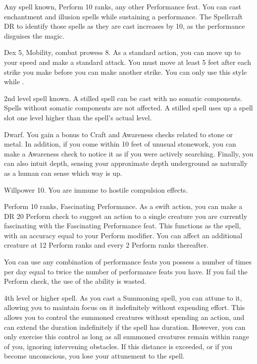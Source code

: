 \featpres Any spell known, Perform 10 ranks, any other Performance feat.
\featben You can cast enchantment and illusion spells while sustaining a performance.
The Spellcraft DR to identify those spells as they are cast increases by 10, as the performance disguises the magic.

\featpres Dex 5, Mobility, combat prowess 8.
\featben As a standard action, you can move up to your speed and make a standard attack.
You must move at least 5 feet after each strike you make before you can make another strike.
You can only use this style while \unencumbered.

\featpre 2nd level spell known.
\featben A stilled spell can be cast with no somatic components.
Spells without somatic components are not affected.
A stilled spell uses up a spell slot one level higher than the spell's actual level.

\featpre Dwarf.
\featben You gain a  bonus to Craft and Awareness checks related to stone or metal.
In addition, if you come within 10 feet of unusual stonework, you can make a Awareness check to notice it as if you were actively searching.
Finally, you can also intuit depth, sensing your approximate depth underground as naturally as a human can sense which way is up.

\featpre Willpower 10.
\featben You are immune to hostile compulsion effects.

\featpres Perform 10 ranks, Fascinating Performance.
\featben As a swift action, you can make a DR 20 Perform check to suggest an action to a single creature you are currently fascinating with the Fascinating Performance feat.
This functions as the  spell, with an accuracy equal to your Perform modifier.
You can affect an additional creature at 12 Perform ranks and every 2 Perform ranks thereafter.

You can use any combination of performance feats you possess a number of times per day equal to twice the number of performance feats you have.
If you fail the Perform check, the use of the ability is wasted.

\featpre 4th level or higher  spell.
\featben As you cast a Summoning spell, you can attune to it, allowing you to maintain focus on it indefinitely without expending effort.
This allows you to control the summoned creatures without spending an action, and can extend the duration indefinitely if the spell has \durshort duration.
However, you can only exercise this control as long as all summoned creatures remain within \rnglong range of you, ignoring intervening obstacles.
If this distance is exceeded, or if you become unconscious, you lose your attunement to the spell.

